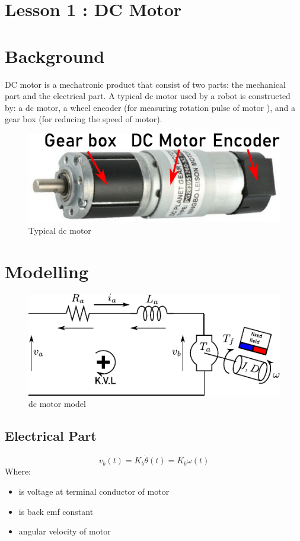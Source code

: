 \documentclass[12pt,a4paper]{article}
\begin{document}
	\section*{\centering Lesson 1 : DC Motor}
	\section{Background}
		DC motor is a mechatronic product that consist of two parts: the mechanical part and the electrical part. A typical dc motor used by a robot is constructed by: a dc motor, a wheel encoder (for measuring rotation pulse of motor ), and a gear box (for reducing the speed of motor).
		
		\begin{figure}[ht]
			\centering
			\includegraphics[scale=1]{src/img/fig1.pdf}
			\caption{Typical dc motor}
			\label{fig:Typical dc motor}
		\end{figure}
		
	\section{Modelling}
	
	\begin{figure}[ht]
		\centering
		\includegraphics[scale=1.7]{src/img/fig2.pdf}
		\caption{dc motor model}
		\label{fig:dc motor model}
	\end{figure}
		
	\subsection{Electrical Part}
	\begin{equation}
		v_b(t) = K_b \dot{\theta}(t) = K_b \omega(t)
		\label{eq1}
	\end{equation}
	Where:
	\begin{itemize}
		\item { is voltage at terminal conductor of motor }
		\item { is back emf constant}
		\item {\makebox[1cm]{\(\dot{\theta} = \omega\)\hfill} angular velocity of motor}
	\end{itemize}
\end{document}
